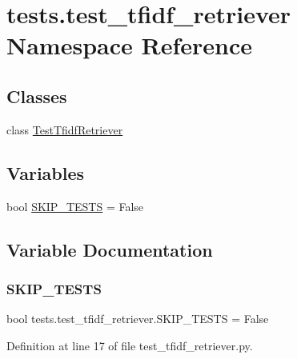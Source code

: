 \hypertarget{namespacetests_1_1test__tfidf__retriever}{}\section{tests.\+test\+\_\+tfidf\+\_\+retriever Namespace Reference}
\label{namespacetests_1_1test__tfidf__retriever}
\subsection*{Classes}
\begin{DoxyCompactItemize}
\item 
class \hyperlink{classtests_1_1test__tfidf__retriever_1_1TestTfidfRetriever}{Test\+Tfidf\+Retriever}
\end{DoxyCompactItemize}
\subsection*{Variables}
\begin{DoxyCompactItemize}
\item 
bool \hyperlink{namespacetests_1_1test__tfidf__retriever_aeb713eada76261422cbe59dad4a1d53e}{S\+K\+I\+P\+\_\+\+T\+E\+S\+TS} = False
\end{DoxyCompactItemize}


\subsection{Variable Documentation}
\mbox{\label{namespacetests_1_1test__tfidf__retriever_aeb713eada76261422cbe59dad4a1d53e}} 
\subsubsection{\texorpdfstring{S\+K\+I\+P\+\_\+\+T\+E\+S\+TS}{SKIP\_TESTS}}
{\footnotesize\ttfamily bool tests.\+test\+\_\+tfidf\+\_\+retriever.\+S\+K\+I\+P\+\_\+\+T\+E\+S\+TS = False}



Definition at line 17 of file test\+\_\+tfidf\+\_\+retriever.\+py.

